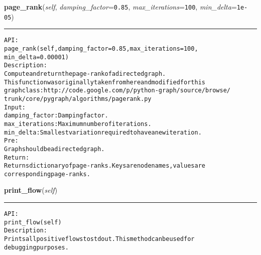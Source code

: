 \hspace{.8\funcindent}\begin{boxedminipage}{\funcwidth}

    \raggedright \textbf{page\_rank}(\textit{self}, \textit{damping\_factor}={\tt 0.85}, \textit{max\_iterations}={\tt 100}, \textit{min\_delta}={\tt 1e-05})

    \vspace{-1.5ex}

    \rule{\textwidth}{0.5\fboxrule}
\setlength{\parskip}{2ex}
\begin{alltt}

API:
    page\_rank(self, damping\_factor=0.85, max\_iterations=100,
          min\_delta=0.00001)
Description:
    Compute and return the page-rank of a directed graph.
    This function was originally taken from here and modified for this
    graph class: http://code.google.com/p/python-graph/source/browse/
    trunk/core/pygraph/algorithms/pagerank.py
Input:
    damping\_factor: Damping factor.
    max\_iterations: Maximum number of iterations.
    min\_delta: Smallest variation required to have a new iteration.
Pre:
    Graph should be a directed graph.
Return:
    Returns dictionary of page-ranks. Keys are node names, values are
    corresponding page-ranks.
\end{alltt}

\setlength{\parskip}{1ex}
    \end{boxedminipage}

    \label{coinor:gimpy:graph:Graph:print_flow}

    \vspace{0.5ex}

\hspace{.8\funcindent}\begin{boxedminipage}{\funcwidth}

    \raggedright \textbf{print\_flow}(\textit{self})

    \vspace{-1.5ex}

    \rule{\textwidth}{0.5\fboxrule}
\setlength{\parskip}{2ex}
\begin{alltt}

API:
    print\_flow(self)
Description:
    Prints all positive flows to stdout. This method can be used for
    debugging purposes.
\end{alltt}

\setlength{\parskip}{1ex}
    \end{boxedminipage}


